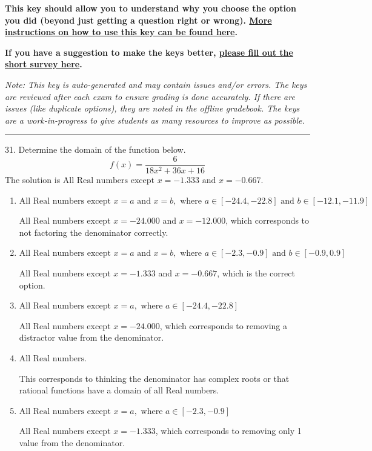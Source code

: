 \documentclass{extbook}[14pt]
\begin{document}
\textbf{This key should allow you to understand why you choose the option you did (beyond just getting a question right or wrong). \href{https://xronos.clas.ufl.edu/mac1105spring2020/courseDescriptionAndMisc/Exams/LearningFromResults}{More instructions on how to use this key can be found here}.}

\textbf{If you have a suggestion to make the keys better, \href{https://forms.gle/CZkbZmPbC9XALEE88}{please fill out the short survey here}.}

\textit{Note: This key is auto-generated and may contain issues and/or errors. The keys are reviewed after each exam to ensure grading is done accurately. If there are issues (like duplicate options), they are noted in the offline gradebook. The keys are a work-in-progress to give students as many resources to improve as possible.}

\rule{\textwidth}{0.4pt}

31. Determine the domain of the function below.
\[ f(x) = \frac{6}{18x^{2} +36 x + 16} \] 
The solution is $ \text{All Real numbers except } x = -1.333 \text{ and } x = -0.667. $ 

\begin{enumerate}[label=\Alph*.] 
\item $ \text{All Real numbers except } x = a \text{ and } x = b, \text{ where } a \in [-24.4, -22.8] \text{ and } b \in [-12.1, -11.9] $ 

 All Real numbers except $x = -24.000$ and $x = -12.000$, which corresponds to not factoring the denominator correctly. 
\item $ \text{All Real numbers except } x = a \text{ and } x = b, \text{ where } a \in [-2.3, -0.9] \text{ and } b \in [-0.9, 0.9] $ 

 All Real numbers except $x = -1.333$ and $x = -0.667$, which is the correct option. 
\item $ \text{All Real numbers except } x = a, \text{ where } a \in [-24.4, -22.8] $ 

 All Real numbers except $x = -24.000$, which corresponds to removing a distractor value from the denominator. 
\item $ \text{All Real numbers.} $ 

 This corresponds to thinking the denominator has complex roots or that rational functions have a domain of all Real numbers. 
\item $ \text{All Real numbers except } x = a, \text{ where } a \in [-2.3, -0.9] $ 

 All Real numbers except $x = -1.333$, which corresponds to removing only 1 value from the denominator. 
\end{enumerate} 
 
\end{document}
